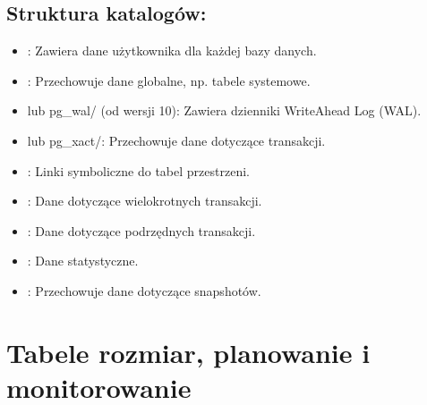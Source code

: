 \documentclass[letterpaper,10pt,polish]{sphinxmanual}
\begin{document}
\section{Struktura katalogów:}
\label{\detokenize{rozdzialy/rozdzial1:struktura-katalogow}}\begin{itemize}
\item {} 
\sphinxAtStartPar
{}: Zawiera dane użytkownika dla każdej bazy danych.

\item {} 
\sphinxAtStartPar
{}: Przechowuje dane globalne, np. tabele systemowe.

\item {} 
\sphinxAtStartPar
{} lub pg\_wal/ (od wersji 10): Zawiera dzienniki Write\sphinxhyphen{}Ahead Log (WAL).

\item {} 
\sphinxAtStartPar
{} lub pg\_xact/: Przechowuje dane dotyczące transakcji.

\item {} 
\sphinxAtStartPar
{}: Linki symboliczne do tabel przestrzeni.

\item {} 
\sphinxAtStartPar
{}: Dane dotyczące wielokrotnych transakcji.

\item {} 
\sphinxAtStartPar
{}: Dane dotyczące podrzędnych transakcji.

\item {} 
\sphinxAtStartPar
{}: Dane statystyczne.

\item {} 
\sphinxAtStartPar
{}: Przechowuje dane dotyczące snapshotów.

\end{itemize}

\sphinxstepscope


\chapter{Tabele \sphinxhyphen{} rozmiar, planowanie i monitorowanie}
\label{\detokenize{rozdzialy/rozdzial2:tabele-rozmiar-planowanie-i-monitorowanie}}\label{\detokenize{rozdzialy/rozdzial2::doc}}
\end{document}
